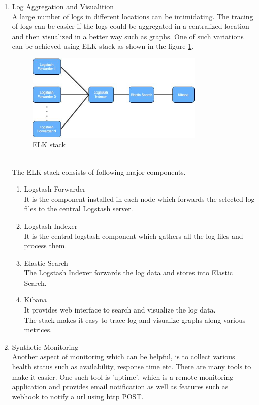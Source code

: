 \begin{enumerate}
\item Log Aggregation and Visualition \\
A large number of logs in different locations can be intimidating. The tracing of logs can be easier if the logs could be aggregated in a centralized location and then visualized in a better way such as graphs. One of such variations can be achieved using ELK stack as shown in the figure \ref{fig:challanges_of_microservices_architecture/elk_stack}. \cite{Anicas:2014aa} \cite{Newman:2015aa}
\begin{figure}[H]
\begin{center}
\includegraphics[width=0.8\textwidth]{figures/challenges_four_elk_stack}
\caption{ELK stack}
\label{fig:challanges_of_microservices_architecture/elk_stack}
\end{center}
\end{figure}
\\
The ELK stack consists of following major components.
\begin{enumerate}
\item Logstash Forwarder \\ It is the component installed in each node which forwards the selected log files to the central Logstash server.
\item Logstash Indexer \\ It is the central logstash component which gathers all the log files and process them.
\item Elastic Search \\ The Logstash Indexer forwards the log data and stores into Elastic Search.
\item Kibana \\ It provides web interface to search and visualize the log data.\\
The stack makes it easy to trace log and visualize graphs along various metrices.
\end{enumerate}
\item Synthetic Monitoring \\ Another aspect of monitoring which can be helpful, is to collect various health status such as availability, response time etc. There are many tools to make it easier. One such tool is 'uptime', which is a remote monitoring application and provides email notification as well as features such as webhook to notify a url using http POST.

\end{enumerate}
